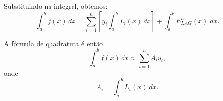 Substituindo na integral, obtemos:
\begin{equation}
  \int_a^bf(x)\,dx = \sum_{i=1}^n\left[y_i\int_a^bL_i(x)\,dx\right] +  \int_a^b E^n_{LAG}(x) \;dx.
\end{equation}

A fórmula de quadratura é então
\begin{equation}
  \int_a^bf(x)\,dx\approx\sum_{i=1}^nA_iy_i,
\end{equation}
onde
\begin{equation}
  A_i=\int_a^b L_i(x)\;dx.
\end{equation}







